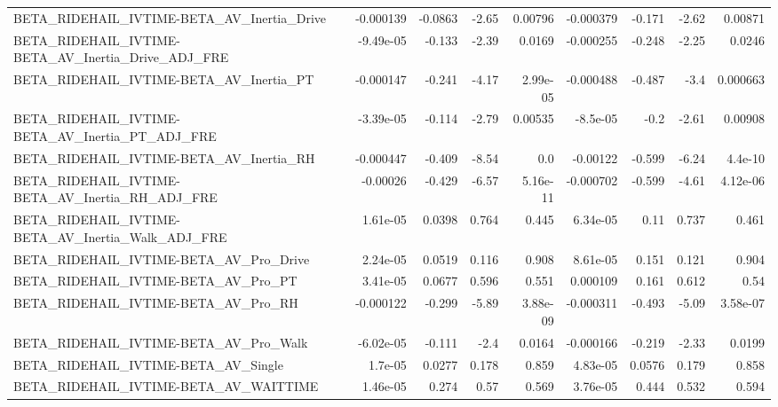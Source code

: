 \begin{tabular}{lrrrrrrrr}
BETA\_RIDEHAIL\_IVTIME-BETA\_AV\_Inertia\_Drive         &   -0.000139 &      -0.0863 &    -2.65 &  0.00796 &  -0.000379 &      -0.171 &        -2.62 &       0.00871 \\
BETA\_RIDEHAIL\_IVTIME-BETA\_AV\_Inertia\_Drive\_ADJ\_FRE &   -9.49e-05 &       -0.133 &    -2.39 &   0.0169 &  -0.000255 &      -0.248 &        -2.25 &        0.0246 \\
BETA\_RIDEHAIL\_IVTIME-BETA\_AV\_Inertia\_PT            &   -0.000147 &       -0.241 &    -4.17 & 2.99e-05 &  -0.000488 &      -0.487 &         -3.4 &      0.000663 \\
BETA\_RIDEHAIL\_IVTIME-BETA\_AV\_Inertia\_PT\_ADJ\_FRE    &   -3.39e-05 &       -0.114 &    -2.79 &  0.00535 &   -8.5e-05 &        -0.2 &        -2.61 &       0.00908 \\
BETA\_RIDEHAIL\_IVTIME-BETA\_AV\_Inertia\_RH            &   -0.000447 &       -0.409 &    -8.54 &      0.0 &   -0.00122 &      -0.599 &        -6.24 &       4.4e-10 \\
BETA\_RIDEHAIL\_IVTIME-BETA\_AV\_Inertia\_RH\_ADJ\_FRE    &    -0.00026 &       -0.429 &    -6.57 & 5.16e-11 &  -0.000702 &      -0.599 &        -4.61 &      4.12e-06 \\
BETA\_RIDEHAIL\_IVTIME-BETA\_AV\_Inertia\_Walk\_ADJ\_FRE  &    1.61e-05 &       0.0398 &    0.764 &    0.445 &   6.34e-05 &        0.11 &        0.737 &         0.461 \\
BETA\_RIDEHAIL\_IVTIME-BETA\_AV\_Pro\_Drive             &    2.24e-05 &       0.0519 &    0.116 &    0.908 &   8.61e-05 &       0.151 &        0.121 &         0.904 \\
BETA\_RIDEHAIL\_IVTIME-BETA\_AV\_Pro\_PT                &    3.41e-05 &       0.0677 &    0.596 &    0.551 &   0.000109 &       0.161 &        0.612 &          0.54 \\
BETA\_RIDEHAIL\_IVTIME-BETA\_AV\_Pro\_RH                &   -0.000122 &       -0.299 &    -5.89 & 3.88e-09 &  -0.000311 &      -0.493 &        -5.09 &      3.58e-07 \\
BETA\_RIDEHAIL\_IVTIME-BETA\_AV\_Pro\_Walk              &   -6.02e-05 &       -0.111 &     -2.4 &   0.0164 &  -0.000166 &      -0.219 &        -2.33 &        0.0199 \\
BETA\_RIDEHAIL\_IVTIME-BETA\_AV\_Single                &     1.7e-05 &       0.0277 &    0.178 &    0.859 &   4.83e-05 &      0.0576 &        0.179 &         0.858 \\
BETA\_RIDEHAIL\_IVTIME-BETA\_AV\_WAITTIME              &    1.46e-05 &        0.274 &     0.57 &    0.569 &   3.76e-05 &       0.444 &        0.532 &         0.594 \\

\end{tabular}
